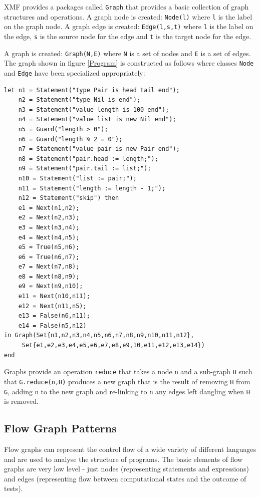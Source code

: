 \documentclass{article}
\begin{document}
XMF provides a packages called {\tt Graph} that provides a basic collection
of graph structures and operations. A graph node is created: {\tt Node(l)}
where {\tt l} is the label on the graph node. A graph edge is created:
{\tt Edge(l,s,t)} where {\tt l} is the label on the edge, {\tt s} is the
source node for the edge and {\tt t} is the target node for the edge. 

A graph is created: {\tt Graph(N,E)} where {\tt N} is a set of nodes and
{\tt E} is a set of edges. The graph shown in figure \ref{Program} is 
constructed as follows where classes {\tt Node} and {\tt Edge} have been 
specialized appropriately:
\begin{verbatim}
let n1 = Statement("type Pair is head tail end");
    n2 = Statement("type Nil is end");
    n3 = Statement("value length is 100 end");
    n4 = Statement("value list is new Nil end");
    n5 = Guard("length > 0");
    n6 = Guard("length % 2 = 0");
    n7 = Statement("value pair is new Pair end");
    n8 = Statement("pair.head := length;");
    n9 = Statement("pair.tail := list;");
    n10 = Statement("list := pair;");
    n11 = Statement("length := length - 1;");
    n12 = Statement("skip") then
    e1 = Next(n1,n2);
    e2 = Next(n2,n3);
    e3 = Next(n3,n4);
    e4 = Next(n4,n5);
    e5 = True(n5,n6);
    e6 = True(n6,n7);
    e7 = Next(n7,n8);
    e8 = Next(n8,n9);
    e9 = Next(n9,n10);
    e11 = Next(n10,n11);
    e12 = Next(n11,n5);
    e13 = False(n6,n11);
    e14 = False(n5,n12)
in Graph(Set{n1,n2,n3,n4,n5,n6,n7,n8,n9,n10,n11,n12},
     Set{e1,e2,e3,e4,e5,e6,e7,e8,e9,10,e11,e12,e13,e14})
end
\end{verbatim}
Graphs provide an operation {\tt reduce} that takes a node {\tt n} and a
sub-graph {\tt H} such that {\tt G.reduce(n,H)} produces a new graph that
is the result of removing {\tt H} from {\tt G}, adding {\tt n} to the
new graph and re-linking to {\tt n} any edges left dangling when {\tt H} 
is removed.

\subsection{Flow Graph Patterns}

Flow graphs can represent the control flow of a wide variety of different
languages and are used to analyse the structure of programs. The basic
elements of flow graphs are very low level - just nodes (representing
statements and expressions) and edges (representing flow between computational
states and the outcome of tests).
\end{document}
